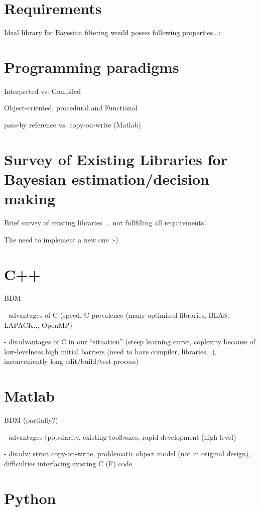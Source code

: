 \documentclass[a4paper,12pt,oneside]{report}
\begin{document}
\section{Requirements}

Ideal library for Bayesian filtering would posses following properties...:

\section{Programming paradigms}

Interpreted vs. Compiled

Object-oriented, procedural and Functional

pass-by reference vs. copy-on-write (Matlab)

\section{Survey of Existing Libraries for Bayesian estimation/decision making}

Brief survey of existing libraries ... not fullfilling all requirements..

The need to implement a new one :-)

\section{C++}

BDM

 - advantages of C (speed, C prevalence (many optimised libraries, BLAS, LAPACK.., OpenMP)

 - disadvantages of C in our ``situation'' (steep learning curve, coplexity because of low-levelness
   high initial barriers (need to have compiler, libraries...), inconveniently long edit/build/test
   process)

\section{Matlab}

BDM (partially?)

 - advantages (popularity, existing toolboxes, rapid development (high-level)

 - disadv: strict copy-on-write, problematic object model (not in original design), difficulties
           interfacing existing C (F) code

\section{Python}
\end{document}
